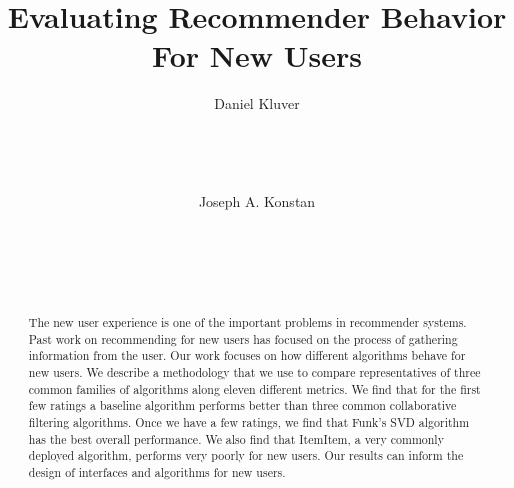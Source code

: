 \documentclass[letterpaper]{sig-alternate}
\begin{document}
\title{Evaluating Recommender Behavior For New Users}


\author {
\alignauthor
Daniel Kluver\\
\\
\\
\\
\\
\alignauthor
Joseph A. Konstan\\
\\
\\
\\
\\
}

\maketitle
\begin{abstract}

  The new user experience is one of the important problems in recommender systems.
  Past work on recommending for new users has focused on the process of gathering information from the user.
  Our work focuses on how different algorithms behave for new users.
  We describe a methodology that we use to compare representatives of three common families of algorithms along eleven different metrics.
  We find that for the first few ratings a baseline algorithm performs better than three common collaborative filtering algorithms.
  Once we have a few ratings, we find that Funk's SVD algorithm has the best overall performance.
  We also find that ItemItem, a very commonly deployed algorithm, performs very poorly for new users.
  Our results can inform the design of interfaces and algorithms for new users.

\end{abstract}



\end{document}
